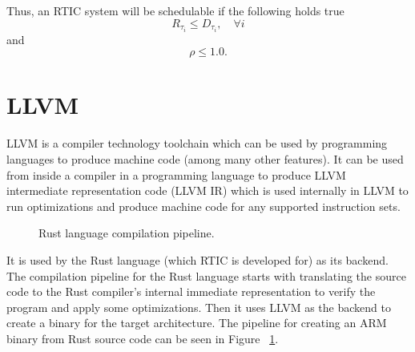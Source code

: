 Thus, an RTIC system will be schedulable if the following holds true
\begin{equation}
    R_{\tau_i} \leq D_{\tau_i}, \quad \forall i
\end{equation}
and
\begin{equation}
    \rho \leq 1.0.
\end{equation}


\section{LLVM}
LLVM is a compiler technology toolchain which can be used by programming
languages to produce machine code (among many other features). It can be used
from inside a compiler in a programming language to produce LLVM intermediate
representation code (LLVM IR) which is used internally in LLVM to run
optimizations and produce machine code for any supported instruction sets.

\begin{figure}[h]
    \centering
    \caption{Rust language compilation pipeline.}
    \label{figure:rustcompilation}
\end{figure}

It is used by the Rust language (which RTIC is developed for) as its backend.
The compilation pipeline for the Rust language starts with translating the
source code to the Rust compiler's internal immediate representation to
verify the program and apply some optimizations. Then it uses LLVM as the backend
to create a binary for the target architecture. The pipeline for creating an
ARM binary from Rust source code can be seen in Figure
~\ref{figure:rustcompilation}.


